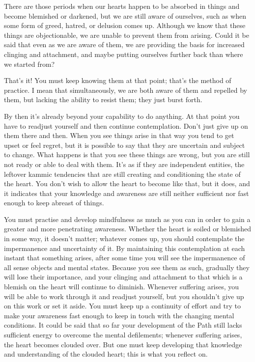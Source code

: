 
\question{}
There are those periods when our hearts happen to be absorbed in
things and become blemished or darkened, but we are still aware of
ourselves, such as when some form of greed, hatred, or delusion comes
up. Although we know that these things are objectionable, we are unable
to prevent them from arising. Could it be said that even as we are aware
of them, we are providing the basis for increased clinging and
attachment, and maybe putting ourselves further back than where we
started from?

That's it! You must keep knowing them at that point; that's the method
of practice. I mean that simultaneously, we are both aware of them and
repelled by them, but lacking the ability to resist them; they just
burst forth.

By then it's already beyond your capability to do anything. At that
point you have to readjust yourself and then continue contemplation. 
Don't just give up on them there and then. When you see things arise in
that way you tend to get upset or feel regret, but it is possible to say
that they are uncertain and subject to change. What happens is that you
see these things are wrong, but you are still not ready or able to deal
with them. It's as if they are independent entities, the leftover kammic
tendencies that are still creating and conditioning the state of the
heart. You don't wish to allow the heart to become like that, but it
does, and it indicates that your knowledge and awareness are still
neither sufficient nor fast enough to keep abreast of things. 

You must practise and develop mindfulness as much as you can in order to
gain a greater and more penetrating awareness. Whether the heart is
soiled or blemished in some way, it doesn't matter; whatever comes up, 
you should contemplate the impermanence and uncertainty of it. By
maintaining this contemplation at each instant that something arises, 
after some time you will see the impermanence of all sense objects and
mental states. Because you see them as such, gradually they will lose
their importance, and your clinging and attachment to that which is a
blemish on the heart will continue to diminish. Whenever suffering
arises, you will be able to work through it and readjust yourself, but
you shouldn't give up on this work or set it aside. You must keep up a
continuity of effort and try to make your awareness fast enough to keep
in touch with the changing mental conditions. It could be said that so
far your development of the Path still lacks sufficient energy to
overcome the mental defilements; whenever suffering arises, the heart
becomes clouded over. But one must keep developing that knowledge and
understanding of the clouded heart; this is what you reflect on. 

